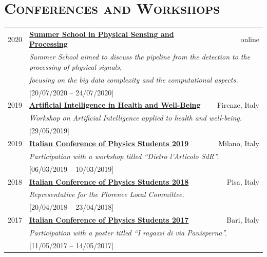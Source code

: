 \documentclass[a4paper, 11pt, notitlepage]{article}
\begin{document}
\vskip 9mm

\section*{\textsc{Conferences and Workshops}}
\begin{tabular*}{\textwidth}{cl @{\extracolsep{\fill}} r}
    {\small 2020} & \href{https://site.unibo.it/school-physical-sensing-and-processing/en}{\textbf{Summer School in Physical Sensing and Processing}} & {\small online}\\
    & \multicolumn{2}{l}{\small \emph{Summer School aimed to discuss the pipeline from the detection to the processing of physical signals,}}\\
    & \multicolumn{2}{l}{\small \emph {focusing on the big data complexity and the computational aspects.}}\\
    & \multicolumn{2}{l}{[20/07/2020 -- 24/07/2020]}\\ [3 mm]

    {\small 2019} & \href{http://www.diitet.cnr.it/workshop-artificial-intelligence-in-health-and-well-being/}{\textbf{Artificial Intelligence in Health and Well-Being}} & {\small Firenze, Italy}\\
    & \multicolumn{2}{l}{\small \emph{Workshop on Artificial Intelligence applied to health and well-being.}}\\
    & \multicolumn{2}{l}{[29/05/2019]}\\ [3 mm]
    
    {\small 2019} & \href{http://ai-sf.it/cisf19/}{\textbf{Italian Conference of Physics Students 2019}} & {\small Milano, Italy}\\
    & \multicolumn{2}{l}{\small \emph{Participation with a workshop titled ``Dietro l'Articolo SdR''.}}\\
    & \multicolumn{2}{l}{[06/03/2019 -- 10/03/2019]}\\ [3 mm]
    
    {\small 2018} & \href{http://ai-sf.it/cisf18/}{\textbf{Italian Conference of Physics Students 2018}} & {\small Pisa, Italy}\\
    & \multicolumn{2}{l}{\small \emph{Representative for the Florence Local Committee.}}\\
    & \multicolumn{2}{l}{[20/04/2018 -- 23/04/2018]}\\ [3 mm]
    
    {\small 2017} & \href{http://www.ai-sf.it/cisf2017/}{\textbf{Italian Conference of Physics Students 2017}} & {\small Bari, Italy}\\
    & \multicolumn{2}{l}{\small \emph{Participation with a poster titled ``I ragazzi di via Panisperna''.}}\\
    & \multicolumn{2}{l}{[11/05/2017 -- 14/05/2017]}\\
\end{tabular*}
\end{document}
